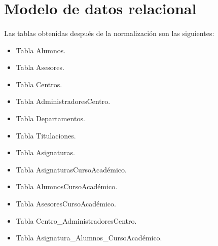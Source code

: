 \section{Modelo de datos relacional}

  \paragraph{}Las tablas obtenidas después de la normalización son las
  siguientes:

  \begin{itemize}
   \item Tabla Alumnos.
   \item Tabla Asesores.
   \item Tabla Centros.
   \item Tabla AdministradoresCentro.
   \item Tabla Departamentos.
   \item Tabla Titulaciones.
   \item Tabla Asignaturas.
   \item Tabla AsignaturasCursoAcadémico.
   \item Tabla AlumnosCursoAcadémico.
   \item Tabla AsesoresCursoAcadémico.
   \item Tabla Centro\_AdministradoresCentro.
   \item Tabla Asignatura\_Alumnos\_CursoAcadémico.
  \end{itemize}













